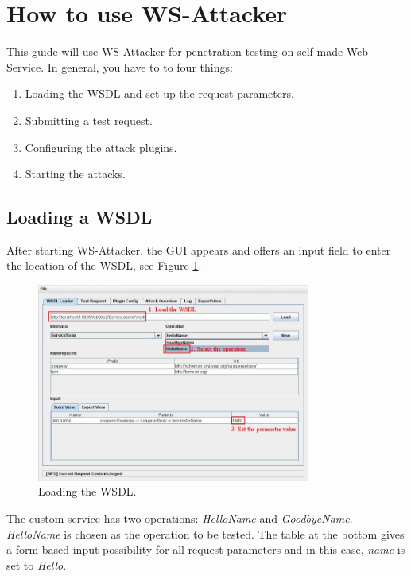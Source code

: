 \section{How to use WS-Attacker}
\label{sec:how_to_use_ws_attacker}

This guide will use WS-Attacker for penetration testing on self-made Web Service.
In general, you have to to four things:

\begin{enumerate}
    \item Loading the WSDL and set up the request parameters.
    \item Submitting a test request.
    \item Configuring the attack plugins.
    \item Starting the attacks.
\end{enumerate}

\subsection{Loading a WSDL}
\label{sec:loading_a_wsdl}

After starting WS-Attacker, the GUI appears and offers an input field to enter the location
of the WSDL, see Figure \ref{fig:load_wsdl}.

\begin{figure}[h!]
    \begin{center}
        \includegraphics[width=0.8\textwidth]{img/load_wsdl}
    \end{center}
    \caption{Loading the WSDL.}
    \label{fig:load_wsdl}
\end{figure}

The custom service has two operations: \emph{HelloName} and \emph{GoodbyeName}.
\emph{HelloName} is chosen as the operation to be tested. The table at the bottom gives a
form based input possibility for all request parameters and in this case, \emph{name} is set to
\emph{Hello}.

